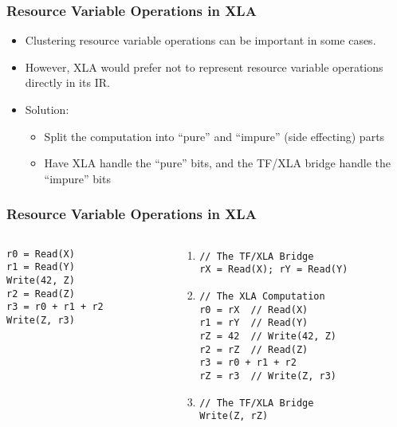\documentclass{beamer}
\begin{document}
\begin{frame}[fragile]
  \frametitle{Resource Variable Operations in XLA}

  \begin{itemize}
  \item Clustering resource variable operations can be important in some cases.

  \item However, XLA would prefer not to represent resource variable operations directly in its IR.

  \item Solution:
    \begin{itemize}
    \item Split the computation into ``pure'' and ``impure'' (side effecting) parts
    \item Have XLA handle the ``pure'' bits, and the TF/XLA bridge handle the ``impure'' bits
    \end{itemize}
  \end{itemize}
\end{frame}

\begin{frame}[fragile]
  \frametitle{Resource Variable Operations in XLA}
  \begin{columns}
    \begin{column}{0.28\textwidth}
\begin{verbatim}
r0 = Read(X)
r1 = Read(Y)
Write(42, Z)
r2 = Read(Z)
r3 = r0 + r1 + r2
Write(Z, r3)
\end{verbatim}
    \end{column}
    \vrule{}
    \begin{column}{0.70\textwidth}
      \begin{enumerate}
        \item
\begin{verbatim}
// The TF/XLA Bridge
rX = Read(X); rY = Read(Y)
\end{verbatim}
        \item
\begin{verbatim}
// The XLA Computation
r0 = rX  // Read(X)
r1 = rY  // Read(Y)
rZ = 42  // Write(42, Z)
r2 = rZ  // Read(Z)
r3 = r0 + r1 + r2
rZ = r3  // Write(Z, r3)
\end{verbatim}
        \item
\begin{verbatim}
// The TF/XLA Bridge
Write(Z, rZ)
\end{verbatim}
      \end{enumerate}
    \end{column}
  \end{columns}
\end{frame}
\end{document}

